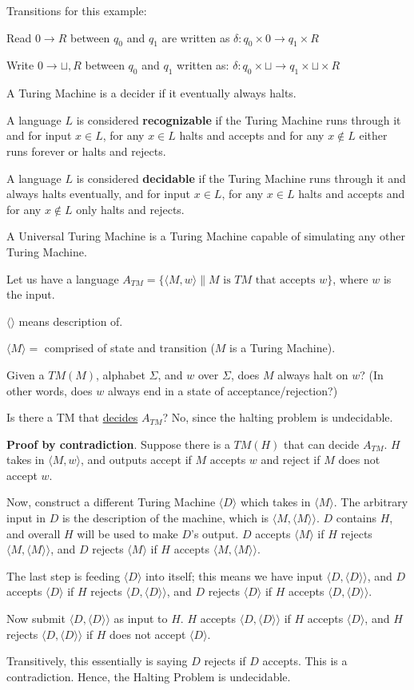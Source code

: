\documentclass{article}
\begin{document}
Transitions for this example:

Read $0 \rightarrow R$ between $q_0$ and $q_1$ are written as $\delta: q_0 \times 0 \rightarrow q_1 \times R$

Write $0 \rightarrow \sqcup, R$ between $q_0$ and $q_1$ written as: $\delta: q_0 \times \sqcup \rightarrow q_1 \times \sqcup \times R$

A Turing Machine is a decider if it eventually always halts.

A language $L$ is considered \textbf{recognizable} if the Turing Machine runs through it and for input $x \in L$, for any $x \in L$ halts and accepts and for any $x \notin L$ either runs forever or halts and rejects.

A language $L$ is considered \textbf{decidable} if the Turing Machine runs through it and always halts eventually, and for input $x \in L$, for any $x \in L$ halts and accepts and for any $x \notin L$ only halts and rejects.

A Universal Turing Machine is a Turing Machine capable of simulating any other Turing Machine.

Let us have a language $A_{TM} = \{\langle M, w\rangle \| M \text{ is } TM \text{ that accepts } w\}$, where $w$ is the input.

$\langle\rangle$ means description of.

$\langle M \rangle =$ comprised of state and transition ($M$ is a Turing Machine).

Given a $TM(M)$, alphabet $\Sigma$, and $w$ over $\Sigma$, does $M$ always halt on $w$? (In other words, does $w$ always end in a state of acceptance/rejection?)

Is there a TM that \underline{decides} $A_{TM}$? No, since the halting problem is undecidable.

\textbf{Proof by contradiction}. Suppose there is a $TM(H)$ that can decide $A_{TM}$. $H$ takes in $\langle M, w \rangle$, and outputs accept if $M$ accepts $w$ and reject if $M$ does not accept $w$.

Now, construct a different Turing Machine $\langle D \rangle$ which takes in $\langle M \rangle$. The arbitrary input in $D$ is the description of the machine, which is $\langle M, \langle M \rangle \rangle$. $D$ contains $H$, and overall $H$ will be used to make $D$'s output. $D$ accepts $\langle M \rangle$ if $H$ rejects $\langle M, \langle M \rangle \rangle$, and $D$ rejects $\langle M \rangle$ if $H$ accepts $\langle M, \langle M \rangle \rangle$.

The last step is feeding $\langle D \rangle$ into itself; this means we have input $\langle D, \langle D \rangle \rangle$, and $D$ accepts $\langle D \rangle$ if $H$ rejects $\langle D, \langle D \rangle \rangle$, and $D$ rejects $\langle D \rangle$ if $H$ accepts $\langle D, \langle D \rangle \rangle$.

Now submit $\langle D, \langle D \rangle \rangle$ as input to $H$. $H$ accepts $\langle D, \langle D \rangle \rangle$ if $H$ accepts $\langle D \rangle$, and $H$ rejects $\langle D, \langle D \rangle \rangle$ if $H$ does not accept $\langle D \rangle$.

Transitively, this essentially is saying $D$ rejects if $D$ accepts. This is a contradiction. Hence, the Halting Problem is undecidable.
\end{document}

